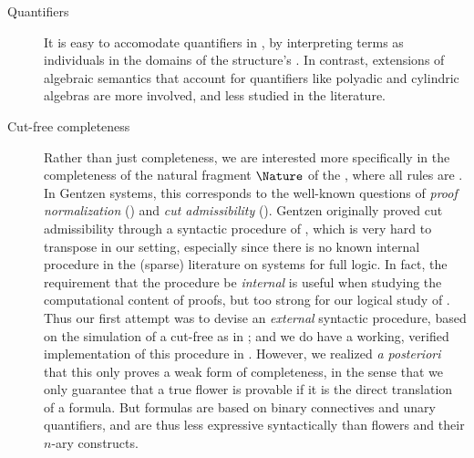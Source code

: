 \begin{scope}
\begin{description}
  \item[Quantifiers]
    It is easy to accomodate quantifiers in , by interpreting
    terms as individuals in the domains of the structure's . In contrast,
    extensions of algebraic semantics that account for quantifiers like polyadic
    and cylindric algebras are more involved, and less studied in the
    literature.
  
  \item[Cut-free completeness]
    Rather than just completeness, we are interested more specifically in the
    completeness of the natural fragment $\Nature$ of the , where
    all rules are \emph{}. In Gentzen systems, this corresponds to
    the well-known questions of \emph{proof normalization} () and \emph{cut admissibility} (). Gentzen
    originally proved cut admissibility through a syntactic procedure of
    \emph{}, which is very hard to transpose in our  setting, especially since there is no known internal
     procedure in the (sparse) literature on  systems for full  logic. In fact, the
    requirement that the procedure be \emph{internal} is useful when studying
    the computational content of proofs, but too strong for our logical study of
    . Thus our first attempt was to devise an \emph{external}
    syntactic procedure, based on the simulation of a cut-free  as in ; and we do have a working,
    verified implementation of this procedure in 
    \cite{flowers-metatheory}. However, we realized \textit{a posteriori} that
    this only proves a weak form of completeness, in the sense that we only
    guarantee that a true flower is provable if it is the direct translation of
    a  formula. But formulas are based on binary connectives and
    unary quantifiers, and are thus less expressive syntactically than flowers
    and their $n$-ary constructs.


\end{description}
\end{scope}
